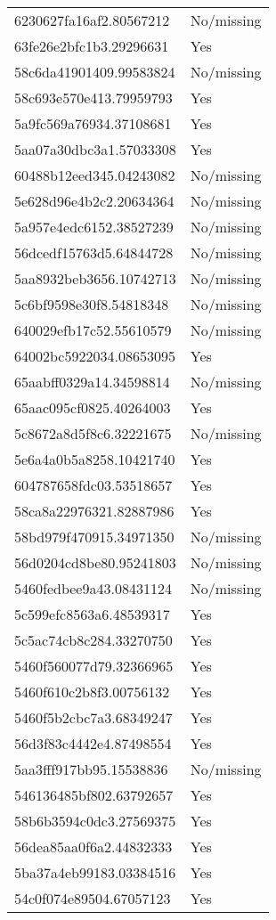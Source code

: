 \begin{tabular}{ll}
6230627fa16af2.80567212 & No/missing \\
63fe26e2bfc1b3.29296631 & Yes \\
58c6da41901409.99583824 & No/missing \\
58c693e570e413.79959793 & Yes \\
5a9fc569a76934.37108681 & Yes \\
5aa07a30dbc3a1.57033308 & Yes \\
60488b12eed345.04243082 & No/missing \\
5e628d96e4b2c2.20634364 & No/missing \\
5a957e4edc6152.38527239 & No/missing \\
56dcedf15763d5.64844728 & No/missing \\
5aa8932beb3656.10742713 & No/missing \\
5c6bf9598e30f8.54818348 & No/missing \\
640029efb17c52.55610579 & No/missing \\
64002bc5922034.08653095 & Yes \\
65aabff0329a14.34598814 & No/missing \\
65aac095cf0825.40264003 & Yes \\
5c8672a8d5f8c6.32221675 & No/missing \\
5e6a4a0b5a8258.10421740 & Yes \\
604787658fdc03.53518657 & Yes \\
58ca8a22976321.82887986 & Yes \\
58bd979f470915.34971350 & No/missing \\
56d0204cd8be80.95241803 & No/missing \\
5460fedbee9a43.08431124 & No/missing \\
5c599efc8563a6.48539317 & Yes \\
5c5ac74cb8c284.33270750 & Yes \\
5460f560077d79.32366965 & Yes \\
5460f610c2b8f3.00756132 & Yes \\
5460f5b2cbc7a3.68349247 & Yes \\
56d3f83c4442e4.87498554 & Yes \\
5aa3fff917bb95.15538836 & No/missing \\
546136485bf802.63792657 & Yes \\
58b6b3594c0dc3.27569375 & Yes \\
56dea85aa0f6a2.44832333 & Yes \\
5ba37a4eb99183.03384516 & Yes \\
54c0f074e89504.67057123 & Yes \\

\end{tabular}
